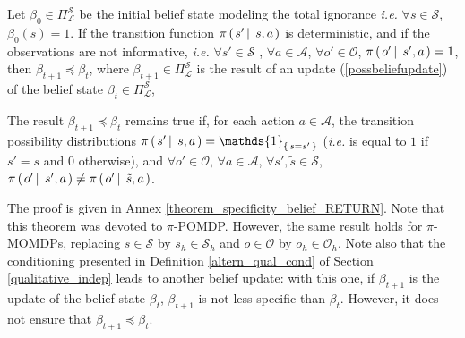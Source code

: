 \begin{theorem}
\label{theorem_specificity_belief}
Let $\beta_0 \in \Pi^{\mathcal{S}}_{\mathcal{L}}$ 
be the initial belief state modeling the total ignorance
\textit{i.e.} $\forall s \in \mathcal{S}$, $\beta_0(s)=1$.
If the transition function $\pi \left( \left.  s' \, \right| \left. \, s, a  \right. \right)$ 
is deterministic,
and if the observations are not informative, 
\textit{i.e.} $\forall s' \in \mathcal{S}$ , $\forall a \in \mathcal{A}$, $\forall o' \in \mathcal{O}$, $\pi \left( \left. o' \, \right| \left. \, s',a \right. \right)=1$,
then $\beta_{t+1} \preceq \beta_{t}$,
where $\beta_{t+1} \in \Pi^{\mathcal{S}}_{\mathcal{L}}$ 
is the result of an update (\ref{possbeliefupdate}) of the belief state 
$\beta_t \in \Pi^{\mathcal{S}}_{\mathcal{L}}$, 

The result $\beta_{t+1} \preceq \beta_{t}$
remains true
if, for each action $a \in \mathcal{A}$,
the transition possibility distributions 
$\pi \paren{s' \sachant s,a  } = \mathds{1}_{\set{s=s'}}$
(\textit{i.e.} is equal to $1$ if $s'=s$ and $0$ otherwise),
and $\forall o' \in \mathcal{O}$, $\forall a \in \mathcal{A}$,
$\forall s', \tilde{s} \in \mathcal{S}$, 
$\pi \left( \left. o' \, \right| \left. \, s',a \right. \right) \neq \pi \left( \left.  o' \, \right| \left. \, \tilde{s}, a  \right. \right)$.
\end{theorem}
The proof is given in Annex \ref{theorem_specificity_belief_RETURN}.
Note that this theorem was devoted to $\pi$-POMDP.
However, the same result holds for $\pi$-MOMDPs,
replacing $s \in \mathcal{S}$ by $s_h \in \mathcal{S}_h$ and $o \in \mathcal{O}$ by $o_h \in \mathcal{O}_h$. 
Note also that the conditioning 
presented in Definition \ref{altern_qual_cond} of Section \ref{qualitative_indep}
leads to another belief update:
with this one, if $\beta_{t+1}$ is the update of the belief state $\beta_t$,
$\beta_{t+1}$ is not less specific than $\beta_t$. 
However, it does not ensure that $\beta_{t+1} \preceq \beta_t$.

